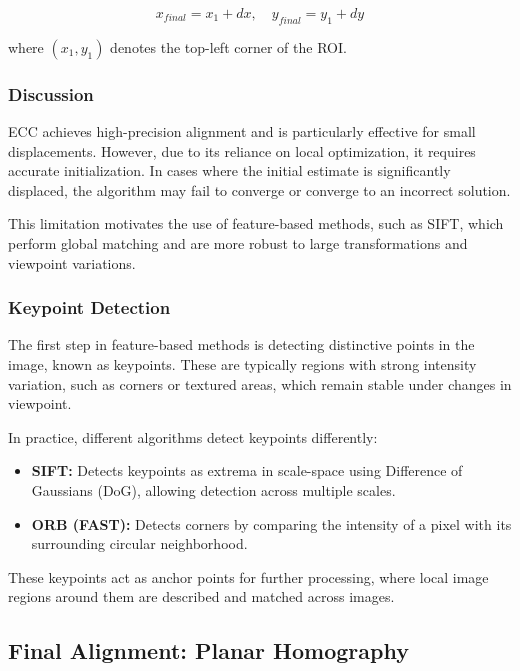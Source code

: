 \documentclass[conference]{IEEEtran}
\begin{document}
\[
x_{final} = x_1 + dx, \quad y_{final} = y_1 + dy
\]

where $(x_1, y_1)$ denotes the top-left corner of the ROI.

\subsubsection{Discussion}

ECC achieves high-precision alignment and is particularly effective for small displacements. However, due to its reliance on local optimization, it requires accurate initialization. In cases where the initial estimate is significantly displaced, the algorithm may fail to converge or converge to an incorrect solution.

This limitation motivates the use of feature-based methods, such as SIFT, which perform global matching and are more robust to large transformations and viewpoint variations.

\subsubsection{Keypoint Detection}

The first step in feature-based methods is detecting distinctive points in the image, known as keypoints. These are typically regions with strong intensity variation, such as corners or textured areas, which remain stable under changes in viewpoint.

In practice, different algorithms detect keypoints differently:

\begin{itemize}[noitemsep]
    \item \textbf{SIFT:} Detects keypoints as extrema in scale-space using Difference of Gaussians (DoG), allowing detection across multiple scales.
    \item \textbf{ORB (FAST):} Detects corners by comparing the intensity of a pixel with its surrounding circular neighborhood.
\end{itemize}

These keypoints act as anchor points for further processing, where local image regions around them are described and matched across images.

\subsection{Final Alignment: Planar Homography}
\end{document}
